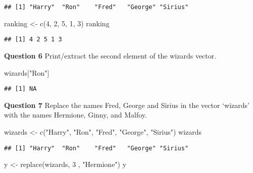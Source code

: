 \documentclass[
]{article}
\newenvironment{Shaded}{\begin{snugshade}}{\end{snugshade}}
\newcommand{\DecValTok}[1]{\textcolor[rgb]{0.00,0.00,0.81}{#1}}
\newcommand{\FunctionTok}[1]{\textcolor[rgb]{0.00,0.00,0.00}{#1}}
\newcommand{\NormalTok}[1]{#1}
\newcommand{\OtherTok}[1]{\textcolor[rgb]{0.56,0.35,0.01}{#1}}
\newcommand{\StringTok}[1]{\textcolor[rgb]{0.31,0.60,0.02}{#1}}
\begin{document}
\begin{verbatim}
## [1] "Harry"  "Ron"    "Fred"   "George" "Sirius"
\end{verbatim}

\begin{Shaded}
\begin{Highlighting}[]
\NormalTok{ranking }\OtherTok{\textless{}{-}} \FunctionTok{c}\NormalTok{(}\DecValTok{4}\NormalTok{, }\DecValTok{2}\NormalTok{, }\DecValTok{5}\NormalTok{, }\DecValTok{1}\NormalTok{, }\DecValTok{3}\NormalTok{)}
\NormalTok{ranking}
\end{Highlighting}
\end{Shaded}

\begin{verbatim}
## [1] 4 2 5 1 3
\end{verbatim}

\textbf{Question 6} Print/extract the second element of the wizards
vector.

\begin{Shaded}
\begin{Highlighting}[]
\NormalTok{wizards[}\StringTok{"Ron"}\NormalTok{]}
\end{Highlighting}
\end{Shaded}

\begin{verbatim}
## [1] NA
\end{verbatim}

\textbf{Question 7} Replace the names Fred, George and Sirius in the
vector `wizards' with the names Hermione, Ginny, and Malfoy.

\begin{Shaded}
\begin{Highlighting}[]
\NormalTok{wizards }\OtherTok{\textless{}{-}} \FunctionTok{c}\NormalTok{(}\StringTok{"Harry"}\NormalTok{, }\StringTok{"Ron"}\NormalTok{, }\StringTok{"Fred"}\NormalTok{, }\StringTok{"George"}\NormalTok{, }\StringTok{"Sirius"}\NormalTok{)}
\NormalTok{wizards}
\end{Highlighting}
\end{Shaded}

\begin{verbatim}
## [1] "Harry"  "Ron"    "Fred"   "George" "Sirius"
\end{verbatim}

\begin{Shaded}
\begin{Highlighting}[]
\NormalTok{y }\OtherTok{\textless{}{-}} \FunctionTok{replace}\NormalTok{(wizards, }\DecValTok{3}\NormalTok{ , }\StringTok{"Hermione"}\NormalTok{)}
\NormalTok{y}
\end{Highlighting}
\end{Shaded}
\end{document}
